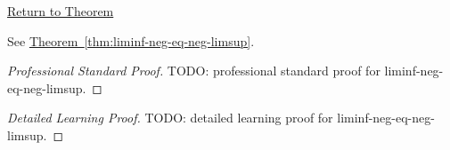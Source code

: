 \newpage
{}
\label{prf:liminf-neg-eq-neg-limsup}

\begin{remark*}[Return]
\hyperref[thm:liminf-neg-eq-neg-limsup]{Return to Theorem}
\end{remark*}

\begin{theorem*}
See \hyperref[thm:liminf-neg-eq-neg-limsup]{Theorem~\ref*{thm:liminf-neg-eq-neg-limsup}}.
\end{theorem*}

\begin{proof}[Professional Standard Proof]
\LRAProofBodyStart
TODO: professional standard proof for liminf-neg-eq-neg-limsup.
\end{proof}

\begin{proof}[Detailed Learning Proof]
\LRAProofBodyStart
TODO: detailed learning proof for liminf-neg-eq-neg-limsup.
\end{proof}

\begin{remark*}
\end{remark*}

\begin{dependencies}
\NoLocalDependencies
\end{dependencies}

\clearpage
